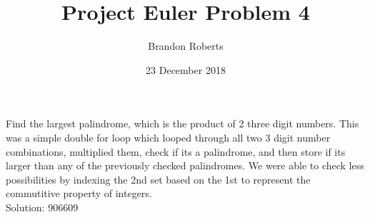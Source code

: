 \documentclass{article}
\begin{document}
\title{Project Euler Problem 4}
\author{Brandon Roberts}
\date{23 December 2018}

\maketitle

Find the largest palindrome, which is the product of 2 three digit numbers. This was a simple double for loop which looped through all two 3 digit number combinations, multiplied them, check if its a palindrome, and then store if its larger than any of the previously checked palindromes. We were able to check less possibilities by indexing the 2nd set based on the 1st to represent the commutitive property of integers.\\
Solution: 906609
\end{document}
